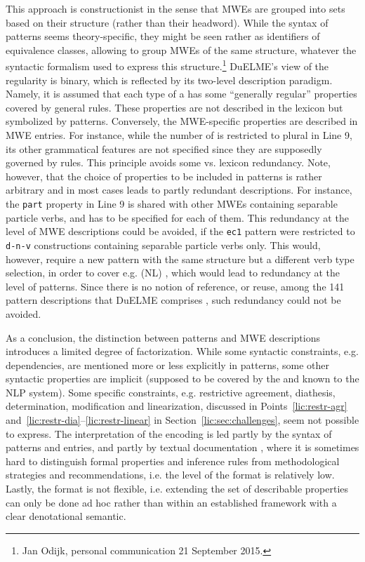 \documentclass[output=paper]{langsci/langscibook}
\begin{document}
This approach is constructionist in the sense that MWEs are grouped into sets based on their structure (rather than their headword). While the syntax of patterns seems theory-specific, they might be seen rather as identifiers of equivalence classes, allowing to group MWEs of the same structure, whatever the syntactic formalism used to express this structure.\footnote{Jan Odijk, personal communication 21 September 2015.} DuELME's view of the regularity is binary, which is reflected by its two-level description paradigm. Namely, it is assumed that each type of a  has some ``generally regular'' properties covered by general  rules. These properties are not described in the lexicon but symbolized by patterns. Conversely, the MWE-specific properties are described in MWE entries. For instance, while the number of  is restricted to plural in Line 9, its other grammatical features are not specified since they are supposedly governed by  rules. This principle avoids some  vs. lexicon redundancy. Note, however, that the choice of properties to be included in patterns is rather arbitrary and in most cases leads to partly redundant descriptions. For instance, the \texttt{part} property in Line 9 is shared with other MWEs containing separable particle verbs, and has to be specified for each of them. This redundancy at the level of MWE descriptions could be avoided, if the \texttt{ec1} pattern were restricted to \texttt{d-n-v} constructions containing separable particle verbs only. This would, however, require a new pattern with the same structure but a different verb type selection, in order to cover e.g. (NL) , which would lead to redundancy at the level of patterns. Since there is no notion of reference, or reuse, among the 141 pattern descriptions that DuELME comprises \citep{gregoire:07}, such redundancy could not be avoided.

As a conclusion, the distinction between patterns and MWE descriptions introduces a limited degree of factorization. While some syntactic constraints, e.g. dependencies, are mentioned more or less explicitly in patterns, some other syntactic properties are implicit (supposed to be covered by the  and known to the NLP system). Some specific constraints, e.g. restrictive agreement, diathesis, determination, modification and linearization, discussed in Points~\ref{lic:restr-agr} and~\ref{lic:restr-dia}--\ref{lic:restr-linear} in Section~\ref{lic:sec:challenges}, seem not possible to express. The interpretation of the encoding is led partly by the syntax of patterns and entries, and partly by textual documentation \citep{gregoire:07c}, where it is sometimes hard to distinguish formal properties and inference rules from methodological strategies and recommendations, i.e. the  level of the format is relatively low. Lastly, the format is not flexible, i.e. extending the set of describable properties can only be done ad hoc rather than within an established framework with a clear denotational semantic.
\end{document}
